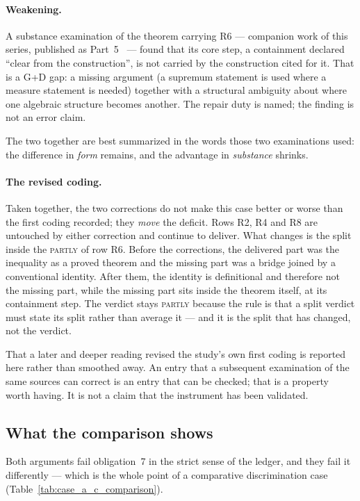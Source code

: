 \documentclass[11pt,a4paper]{article}
\theoremstyle{definition}
\begin{document}
\paragraph{Weakening.} A substance examination of the theorem carrying R6 ---
companion work of this series, published as Part~5~\cite{GeigerSubstance2026} --- found that
its core step, a containment declared ``clear from the construction'', is not
carried by the construction cited for it. That is a G+D gap: a missing
argument (a supremum statement is used where a measure statement is needed)
together with a structural ambiguity about where one algebraic structure becomes
another. The repair duty is named; the finding is not an error claim.

The two together are best summarized in the words those two examinations used:
the difference in \emph{form} remains, and the advantage in \emph{substance}
shrinks.

\paragraph{The revised coding.} Taken together, the two corrections do not make
this case better or worse than the first coding recorded; they \emph{move} the
deficit. Rows R2, R4 and R8 are untouched by either correction and continue to
deliver. What changes is the split inside the \textsc{partly} of row R6. Before the
corrections, the delivered part was the inequality as a proved theorem and the
missing part was a bridge joined by a conventional identity. After them, the
identity is definitional and therefore not the missing part, while the missing part
sits inside the theorem itself, at its containment step. The verdict stays
\textsc{partly} because the rule is that a split verdict must state its split
rather than average it --- and it is the split that has changed, not the verdict.

That a later and deeper reading revised the study's own first coding is reported
here rather than smoothed away. An entry that a subsequent examination of the same
sources can correct is an entry that can be checked; that is a property worth
having. It is not a claim that the instrument has been validated.

\subsection{What the comparison shows}

Both arguments fail obligation~7 in the strict sense of the ledger, and they fail
it differently --- which is the whole point of a comparative discrimination case (Table~\ref{tab:case_a_c_comparison}).
\end{document}
